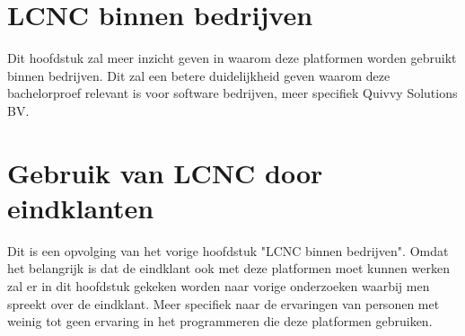 \section{LCNC binnen bedrijven}
\label{sec:lcnc-bedrijven}
Dit hoofdstuk zal meer inzicht geven in waarom deze platformen worden gebruikt binnen bedrijven. Dit zal een betere duidelijkheid geven
waarom deze bachelorproef relevant is voor software bedrijven, meer specifiek Quivvy Solutions BV.

\section{Gebruik van LCNC door eindklanten}
\label{sec:lcnc-eindklanten}
Dit is een opvolging van het vorige hoofdstuk "LCNC binnen bedrijven". Omdat het belangrijk is dat de eindklant ook met deze platformen moet kunnen werken
zal er in dit hoofdstuk gekeken worden naar vorige onderzoeken waarbij men spreekt over de eindklant. 
Meer specifiek naar de ervaringen van personen met weinig tot geen ervaring in het programmeren die deze platformen gebruiken.






